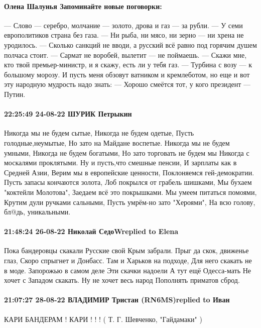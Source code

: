 \paragraph{Олена Шалунья Запоминайте новые поговорки:}

— Слово — серебро, молчание — золото, дрова и газ — за рубли.
— У семи европолитиков страна без газа.
— Ни рыба, ни мясо, ни зерно — ни хрена не уродилось.
— Сколько санкций не вводи, а русский всё равно под горячим душем полчаса стоит.
— Сармат не воробей, вылетит — не поймаешь.
— Скажи мне, кто твой премьер-министр, и я скажу, есть ли у тебя газ.
— Турбина с возу — к большому морозу.
И пусть меня обзовут ватником и кремлеботом, но еще и вот эту народную мудрость надо знать:
— Хорошо смеётся тот, у кого президент — Путин.

\paragraph{22:25:49 24-08-22 ШУРИК Петрыкин}

Никогда мы не будем сытые, Никогда не будем одетые,
Пусть голодные,неумытые, Но зато на Майдане воспетые.
Никогда мы не будем умными, Никогда не будем богатыми,
Но зато торговать не будем мы Никогда с москалями проклятыми.
Ну и пусть,что смешные пенсии, И зарплаты как в Средней Азии,
Верим мы в европейские ценности, Поклоняемся гей-демократии.
Пусть запасы кончаются золота, Лоб покрылся от грабель шишками,
Мы бухаем "коктейли Молотова", Заедаем всё это покрышками.
Мы умеем питаться помоями, Крутим дули ручками сальными,
Пусть умрём-но зато "Хероями", На всю голову, бл@дь, уникальными.


\paragraph{21:48:24 26-08-22 Николай СедоWreplied to Elena}

Пока бандеровцы скакали
Русские свой Крым забрали.
Прыг да скок, движенье глаз,
Скоро спрыгнет и Донбасс.
Там и Харьков на подходе,
Для него скакать не в моде.
Запорожью в самом деле
Эти скачки надоели
А тут ещё Одесса-мать
Не хочет с Западом скакать.
Ну не хочет весь народ
Пополнять приматов сброд.

\paragraph{21:07:27 28-08-22 ВЛАДИМИР Тристан (RN6MS)replied to Иван}

КАРИ БАНДЕРАМ !
КАРИ ! ! !
( Т. Г. Шевченко, "Гайдамаки" )



